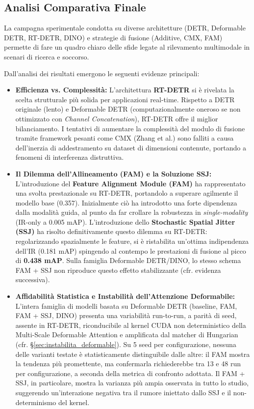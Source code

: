\documentclass[a4paper,11pt]{article}
\begin{document}

\newpage
\subsection*{Analisi Comparativa Finale}

La campagna sperimentale condotta su diverse architetture (DETR, Deformable DETR, RT-DETR, DINO) e strategie di fusione (Additive, CMX, FAM) permette di fare un quadro chiaro delle sfide legate al rilevamento multimodale in scenari di ricerca e soccorso.

Dall'analisi dei risultati emergono le seguenti evidenze principali:

\begin{itemize}
    \item \textbf{Efficienza vs. Complessità:}
    L'architettura \textbf{RT-DETR} si è rivelata la scelta strutturale più solida per applicazioni real-time. Rispetto a DETR originale (lento) e Deformable DETR (computazionalmente oneroso se non ottimizzato con \textit{Channel Concatenation}), RT-DETR offre il miglior bilanciamento. I tentativi di aumentare la complessità del modulo di fusione tramite framework pesanti come CMX (Zhang et al.) sono falliti a causa dell'inerzia di addestramento su dataset di dimensioni contenute, portando a fenomeni di interferenza distruttiva.

    \item \textbf{Il Dilemma dell'Allineamento (FAM) e la Soluzione SSJ:}
    L'introduzione del \textbf{Feature Alignment Module (FAM)} ha rappresentato una svolta prestazionale su RT-DETR, portandolo a superare agilmente il modello base (0.357). Inizialmente ciò ha introdotto una forte dipendenza dalla modalità guida, al punto da far crollare la robustezza in \textit{single-modality} (IR-only a 0.005 mAP). L'introduzione dello \textbf{Stochastic Spatial Jitter (SSJ)} ha risolto definitivamente questo dilemma su RT-DETR: regolarizzando spazialmente le feature, si è ristabilita un'ottima indipendenza dell'IR (0.181 mAP) spingendo al contempo le prestazioni di fusione al picco di \textbf{0.438 mAP}. Sulla famiglia Deformable DETR/DINO, lo stesso schema FAM + SSJ non riproduce questo effetto stabilizzante (cfr. evidenza successiva).

    \item \textbf{Affidabilità Statistica e Instabilità dell'Attenzione Deformabile:}
    L'intera famiglia di modelli basata su Deformable DETR (baseline, FAM, FAM + SSJ, DINO) presenta una variabilità run-to-run, a parità di seed, assente in RT-DETR, riconducibile al kernel CUDA non deterministico della Multi-Scale Deformable Attention e amplificata dal matcher di Hungarian (cfr. \S\ref{sec:instabilita_deformable}). Su 5 seed per configurazione, nessuna delle varianti testate è statisticamente distinguibile dalle altre: il FAM mostra la tendenza più promettente, ma confermarla richiederebbe tra 13 e 48 run per configurazione, a seconda della metrica di confronto adottata. Il FAM + SSJ, in particolare, mostra la varianza più ampia osservata in tutto lo studio, suggerendo un'interazione negativa tra il rumore iniettato dallo SSJ e il non-determinismo del kernel.


\end{itemize}
\end{document}
